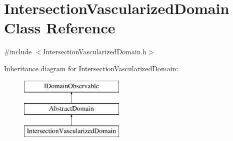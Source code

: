 \hypertarget{class_intersection_vascularized_domain}{}\section{Intersection\+Vascularized\+Domain Class Reference}
\label{class_intersection_vascularized_domain}


{\ttfamily \#include $<$Intersection\+Vascularized\+Domain.\+h$>$}

Inheritance diagram for Intersection\+Vascularized\+Domain\+:\begin{figure}[H]
\begin{center}
\leavevmode
\includegraphics[height=3.000000cm]{d0/d59/class_intersection_vascularized_domain}
\end{center}
\end{figure}
